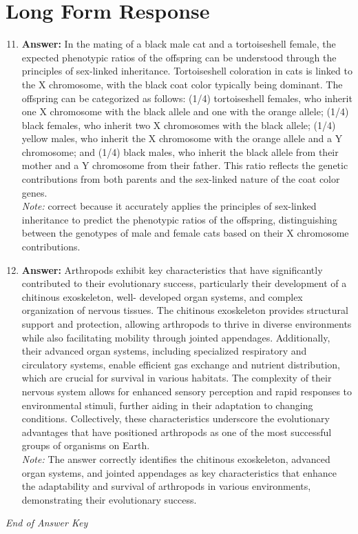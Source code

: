 \documentclass[12pt]{article}
\begin{document}
\section*{Long Form Response}
\begin{enumerate}[label=\arabic*.]
\setcounter{enumi}{10}
\item \textbf{Answer:} In the mating of a black male cat and a tortoiseshell female, the expected phenotypic ratios of the offspring can be understood through the principles of sex-linked inheritance. Tortoiseshell coloration in cats is linked to the X chromosome, with the black coat color typically being dominant. The offspring can be categorized as follows: (1/4) tortoiseshell females, who inherit one X chromosome with the black allele and one with the orange allele; (1/4) black females, who inherit two X chromosomes with the black allele; (1/4) yellow males, who inherit the X chromosome with the orange allele and a Y chromosome; and (1/4) black males, who inherit the black allele from their mother and a Y chromosome from their father. This ratio reflects the genetic contributions from both parents and the sex-linked nature of the coat color genes.
\\ \textit{Note:} correct because it accurately applies the principles of sex-linked inheritance to predict the phenotypic ratios of the offspring, distinguishing between the genotypes of male and female cats based on their X chromosome contributions.
\item \textbf{Answer:} Arthropods exhibit key characteristics that have significantly contributed to their evolutionary success, particularly their development of a chitinous exoskeleton, well- developed organ systems, and complex organization of nervous tissues. The chitinous exoskeleton provides structural support and protection, allowing arthropods to thrive in diverse environments while also facilitating mobility through jointed appendages. Additionally, their advanced organ systems, including specialized respiratory and circulatory systems, enable efficient gas exchange and nutrient distribution, which are crucial for survival in various habitats. The complexity of their nervous system allows for enhanced sensory perception and rapid responses to environmental stimuli, further aiding in their adaptation to changing conditions. Collectively, these characteristics underscore the evolutionary advantages that have positioned arthropods as one of the most successful groups of organisms on Earth.
\\ \textit{Note:} The answer correctly identifies the chitinous exoskeleton, advanced organ systems, and jointed appendages as key characteristics that enhance the adaptability and survival of arthropods in various environments, demonstrating their evolutionary success.
\end{enumerate}

\vfill
\noindent\textit{End of Answer Key}
\end{document}
